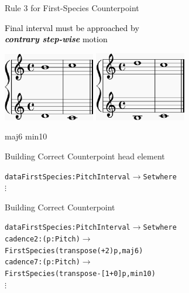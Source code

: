 \documentclass[14pt]{beamer}
\newcommand{\blue}[1]{\textcolor{bcolor}{#1}}
\newcommand{\black}[1]{\textcolor{black}{#1}}
\newcommand{\ablue}[1]{\textcolor{ablue}{#1}}
\newcommand{\agreen}[1]{\textcolor{agreen}{#1}}
\newcommand{\aorange}[1]{\textcolor{aorange}{#1}}
\newcommand{\apurple}[1]{\textcolor{apurple}{#1}}
\newcommand{\empha}[1]{\textit{\textbf{#1}}}
\newcommand{\bscreen}[1]{\blue{
\begin{screen}
\begin{center}
\black{#1}
\end{center}
\end{screen}
}}
\begin{document}
\begin{frame}{Rule 3 for First-Species Counterpoint}
\bscreen{
Final interval must be approached by \\
\empha{contrary step-wise} motion
}

\vspace{-2mm}

\begin{center}
\includegraphics[width=4cm]{figures/cadence2.eps}
\hspace{8mm}
\includegraphics[width=4cm]{figures/cadence7.eps}
\end{center}
\vspace{-4mm}
\begin{small}
\hspace{2.15cm} maj6 \hspace{4cm} min10
\end{small}
\end{frame}

\begin{frame}[fragile]{Building Correct Counterpoint}
\hspace{4.5cm} head element
\begin{small}
\vspace{-3mm}
\begin{alltt}
\aorange{data} \ablue{FirstSpecies} : \ablue{PitchInterval} \(\rightarrow\) \ablue{Set} \aorange{where}
      \(\vdots\)
\end{alltt}
\end{small}
\vspace{4.13cm}
\end{frame}

\begin{frame}[fragile]{Building Correct Counterpoint}
\begin{small}
\begin{alltt}
\aorange{data} \ablue{FirstSpecies} : \ablue{PitchInterval} \(\rightarrow\) \ablue{Set} \aorange{where}
  \agreen{cadence2} : (p : \ablue{Pitch}) \(\rightarrow\)
    \ablue{FirstSpecies} (\ablue{transpose} (\agreen{+} \apurple{2}) p \agreen{,} \agreen{maj6})
  \agreen{cadence7} : (p : \ablue{Pitch}) \(\rightarrow\)
    \ablue{FirstSpecies} (\ablue{transpose} \agreen{-[1+} \apurple{0} \agreen{]} p \agreen{,} \agreen{min10})
      \(\vdots\)
\end{alltt}
\end{small}
\vspace{1.88cm}
\end{frame}
\end{document}
